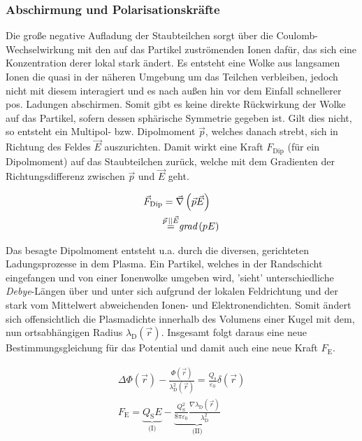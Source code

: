 \documentclass[numbers=noenddot,a4paper]{scrartcl}
\newcommand{\ix}[1]{_\text{#1}}
\newcommand{\tilt}[1]{\textit{#1}}
\newcommand{\grad}[1]{\textit{grad}\left(#1\right)}
\begin{document}
				\subsubsection{Abschirmung und Polarisationskräfte}\label{subsub:abschirm}
				
				Die große negative Aufladung der Staubteilchen sorgt über die Coulomb-Wechselwirkung mit den auf das Partikel zuströmenden Ionen dafür, das sich eine Konzentration derer lokal stark ändert. Es entsteht eine Wolke aus langsamen Ionen die quasi in der näheren Umgebung um das Teilchen verbleiben, jedoch nicht mit diesem interagiert und es nach außen hin vor dem Einfall schnellerer pos. Ladungen abschirmen. Somit gibt es keine direkte Rückwirkung der Wolke auf das Partikel, sofern dessen sphärische Symmetrie gegeben ist. Gilt dies nicht, so entsteht ein Multipol- bzw. Dipolmoment $\vec{p}$, welches danach strebt, sich in Richtung des Feldes $\vec{E}$ auszurichten. Damit wirkt eine Kraft $F\ix{Dip}$ (für ein Dipolmoment) auf das Staubteilchen zurück, welche mit dem Gradienten der Richtungsdifferenz zwischen $\vec{p}$ und $\vec{E}$ geht.

					\begin{align}
						\centering
						\vec{F}\ix{Dip}&=\vec{\nabla}\left(\vec{p}\vec{E}\right)\\
						&{\overset{\vec{p}\,||\vec{E}}{=}}\grad{pE} \nonumber
					\end{align}
					
				Das besagte Dipolmoment entsteht u.a. durch die diversen, gerichteten Ladungsprozesse in dem Plasma. Ein Partikel, welches in der Randschicht eingefangen und von einer Ionenwolke umgeben wird, 'sieht' unterschiedliche \tilt{Debye}-Längen über und unter sich aufgrund der lokalen Feldrichtung und der stark vom Mittelwert abweichenden Ionen- und Elektronendichten. Somit ändert sich offensichtlich die Plasmadichte innerhalb des Volumens einer Kugel mit dem, nun ortsabhängigen Radius $\lambda\ix{D}\left(\vec{r}\right)$. Insgesamt folgt daraus eine neue Bestimmungsgleichung für das Potential und damit auch eine neue Kraft $F\ix{E}$.
				
					\begin{align}
						\Delta \Phi\left(\vec{r}\right)-\frac{\Phi\left(\vec{r}\right)}{\lambda\ix{D}^2\left(\vec{r}\right)}=\frac{Q\ix{s}}{\varepsilon\ix{0}}\delta\left(\vec{r}\right) \\
						F\ix{E}=\underbrace{Q\ix{S}E}_{\text{(I)}}-\underbrace{\frac{Q\ix{S}^2}{8\pi\varepsilon\ix{0}}\frac{\nabla\lambda\ix{D}\left(\vec{r}\right)}{\lambda\ix{D}^2}}_{\text{(II)}}
					\end{align}
				
\end{document}
